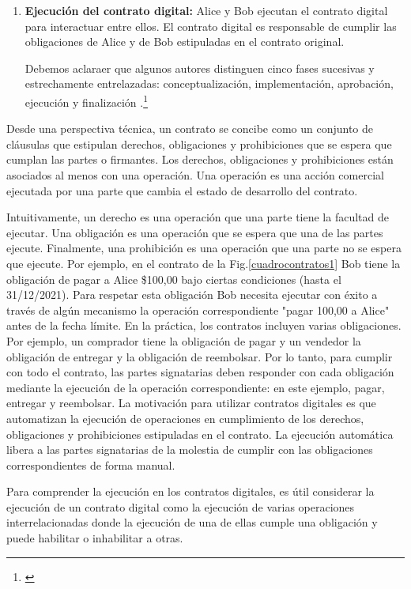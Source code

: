 \documentclass[12pt]{report} %
\begin{document}
\begin{enumerate}
\item \textbf {Ejecución del contrato digital:} Alice y Bob ejecutan el contrato digital para interactuar entre ellos. El contrato digital es responsable de cumplir las obligaciones de Alice y de Bob estipuladas en el contrato original.

Debemos aclaraer que algunos autores distinguen cinco fases sucesivas y estrechamente entrelazadas: conceptualización, implementación, aprobación, ejecución y finalización  .\footnote{\cite{ChristianSi2021}}


\end{enumerate}


 Desde una perspectiva técnica, un contrato se concibe como un conjunto de cláusulas que estipulan derechos, obligaciones y prohibiciones que se espera que cumplan las partes o firmantes. Los derechos, obligaciones y prohibiciones están asociados al menos con una operación. Una operación es una acción comercial ejecutada por una parte que cambia el estado de desarrollo del contrato.   

Intuitivamente, un derecho es una operación que una parte tiene la facultad de  ejecutar. Una obligación es una operación que se espera que una de las partes ejecute. Finalmente, una prohibición es una operación que una parte no se espera que ejecute. Por ejemplo, en el contrato de la Fig.\ref{cuadrocontratos1} Bob tiene la obligación de pagar a Alice \$100,00 bajo ciertas condiciones (hasta el 31/12/2021). Para respetar esta obligación Bob necesita ejecutar con éxito a través de algún mecanismo la operación correspondiente "pagar 100,00 a Alice" antes de la fecha límite. En la práctica, los contratos incluyen varias obligaciones. Por ejemplo, un comprador tiene la obligación de pagar y un vendedor la obligación de entregar y la obligación de reembolsar. Por lo tanto, para cumplir con todo el contrato, las partes signatarias deben responder con cada obligación mediante la ejecución de la operación correspondiente: en este ejemplo, pagar, entregar y reembolsar. La motivación para utilizar contratos digitales es que automatizan la ejecución de operaciones en cumplimiento de los derechos, obligaciones y prohibiciones estipuladas en el contrato. La ejecución automática libera a las partes signatarias de la molestia de cumplir con las obligaciones correspondientes de forma manual.

Para comprender la ejecución en los contratos digitales, es útil considerar la ejecución de un contrato digital como la ejecución de varias operaciones interrelacionadas donde la ejecución de una de ellas cumple una obligación y puede habilitar o inhabilitar a otras.
\end{document}
